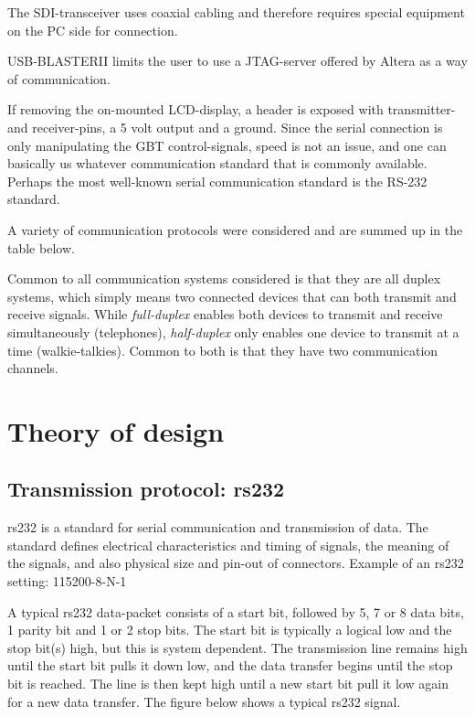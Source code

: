 \documentclass[main.tex]{subfiles}
\begin{document}
The SDI-transceiver uses coaxial cabling and therefore requires special equipment on the PC side for connection.

USB-BLASTERII limits the user to use a JTAG-server offered by Altera as a way of communication. 

If removing the on-mounted LCD-display, a header is exposed with transmitter- and receiver-pins, a 5 volt output and a ground. Since the serial connection is only manipulating the GBT control-signals, speed is not an issue, and one can basically us whatever communication standard that is commonly available. Perhaps the most well-known serial communication standard is the RS-232 standard.

A variety of communication protocols were considered and are summed up in the table below. 

Common to all communication systems considered is that they are all duplex systems, which simply means two connected devices that can both transmit and receive signals. While \textit{full-duplex} enables both devices to transmit and receive simultaneously (telephones), \textit{half-duplex} only enables one device to transmit at a time (walkie-talkies). Common to both is that they have two communication channels. 





\section{Theory of design}


\subsection{Transmission protocol: \gls{rs232}}

\gls{rs232} is a standard for serial communication and transmission of data. The standard defines electrical characteristics and timing of signals, the meaning of the signals, and also physical size and pin-out of connectors.
Example of an \gls{rs232} setting: 115200-8-N-1

A typical \gls{rs232} data-packet consists of a start bit, followed by 5, 7 or 8 data bits, 1 parity bit and 1 or 2 stop bits. The start bit is typically a logical low and the stop bit(s) high, but this is system dependent. The transmission line remains high until the start bit pulls it down low, and the data transfer begins until the stop bit is reached. The line is then kept high until a new start bit pull it low again for a new data transfer. The figure below shows a typical \gls{rs232} signal.
\end{document}
